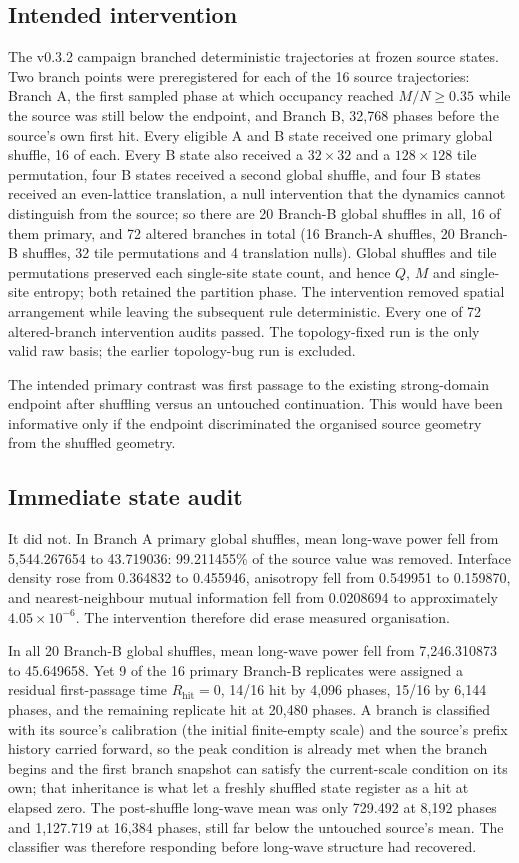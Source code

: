 \documentclass[11pt,a4paper]{article}
\begin{document}
\subsection{Intended intervention}
The v0.3.2 campaign branched deterministic trajectories at frozen source states. Two branch points were preregistered for each of the 16 source trajectories: Branch A, the first sampled phase at which occupancy reached $M/N\geq0.35$ while the source was still below the endpoint, and Branch B, 32,768 phases before the source's own first hit. Every eligible A and B state received one primary global shuffle, 16 of each. Every B state also received a $32\times32$ and a $128\times128$ tile permutation, four B states received a second global shuffle, and four B states received an even-lattice translation, a null intervention that the dynamics cannot distinguish from the source; so there are 20 Branch-B global shuffles in all, 16 of them primary, and 72 altered branches in total (16 Branch-A shuffles, 20 Branch-B shuffles, 32 tile permutations and 4 translation nulls). Global shuffles and tile permutations preserved each single-site state count, and hence $Q$, $M$ and single-site entropy; both retained the partition phase. The intervention removed spatial arrangement while leaving the subsequent rule deterministic. Every one of 72 altered-branch intervention audits passed. The topology-fixed run is the only valid raw basis; the earlier topology-bug run is excluded.

The intended primary contrast was first passage to the existing strong-domain endpoint after shuffling versus an untouched continuation. This would have been informative only if the endpoint discriminated the organised source geometry from the shuffled geometry.

\subsection{Immediate state audit}
It did not. In Branch A primary global shuffles, mean long-wave power fell from 5,544.267654 to 43.719036: 99.211455\% of the source value was removed. Interface density rose from 0.364832 to 0.455946, anisotropy fell from 0.549951 to 0.159870, and nearest-neighbour mutual information fell from 0.0208694 to approximately $4.05\times10^{-6}$. The intervention therefore did erase measured organisation.

In all 20 Branch-B global shuffles, mean long-wave power fell from 7,246.310873 to 45.649658. Yet 9 of the 16 primary Branch-B replicates were assigned a residual first-passage time $R_{\mathrm{hit}}=0$, 14/16 hit by 4,096 phases, 15/16 by 6,144 phases, and the remaining replicate hit at 20,480 phases. A branch is classified with its source's calibration (the initial finite-empty scale) and the source's prefix history carried forward, so the peak condition is already met when the branch begins and the first branch snapshot can satisfy the current-scale condition on its own; that inheritance is what let a freshly shuffled state register as a hit at elapsed zero. The post-shuffle long-wave mean was only 729.492 at 8,192 phases and 1,127.719 at 16,384 phases, still far below the untouched source's mean. The classifier was therefore responding before long-wave structure had recovered.
\end{document}
